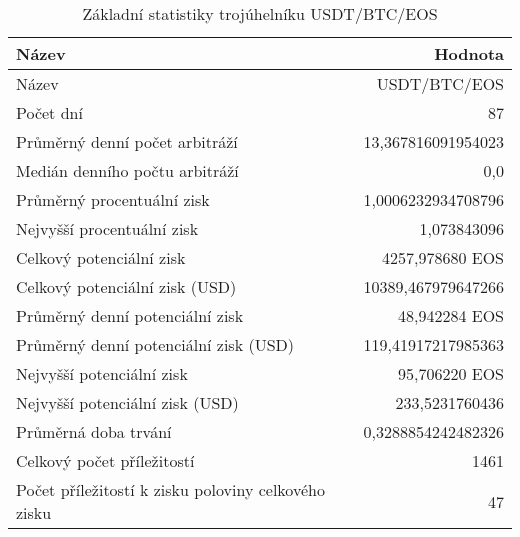 \begin{table}\centering
\caption{Základní statistiky trojúhelníku USDT/BTC/EOS}
\label{USDTBTCEOS_stats}
\begin{tabular}{|| l | r ||}
\hline Název & Hodnota \\ 
\hline\hline Název & USDT/BTC/EOS \\ 
\hline Počet dní & 87 \\ 
\hline Průměrný denní počet arbitráží & 13,367816091954023 \\ 
\hline Medián denního počtu arbitráží & 0,0 \\ 
\hline Průměrný procentuální zisk & 1,0006232934708796 \\ 
\hline Nejvyšší procentuální zisk & 1,073843096 \\ 
\hline Celkový potenciální zisk & 4257,978680 EOS \\ 
\hline Celkový potenciální zisk (USD) & 10389,467979647266 \\ 
\hline Průměrný denní potenciální zisk & 48,942284 EOS \\ 
\hline Průměrný denní potenciální zisk (USD) & 119,41917217985363 \\ 
\hline Nejvyšší potenciální zisk & 95,706220 EOS \\ 
\hline Nejvyšší potenciální zisk (USD) & 233,5231760436 \\ 
\hline Průměrná doba trvání & 0,3288854242482326 \\ 
\hline Celkový počet příležitostí & 1461 \\ 
\hline Počet příležitostí k zisku poloviny celkového zisku & 47 \\ 
\hline
\end{tabular}
\end{table}